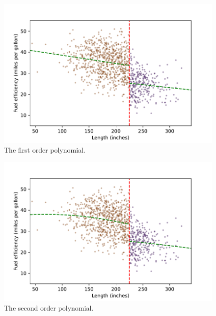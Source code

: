 \documentclass{article}
\begin{document}
\begin{figure}[h!]
    \centering
    \includegraphics{homework 7/output/figure/scatterplot2.pdf}
    \caption{The first order polynomial.}
    \label{fig:scatterplot2}
\end{figure}


\begin{figure}[h!]
    \centering
    \includegraphics{homework 7/output/figure/scatterplot3.pdf}
    \caption{The second order polynomial.}
    \label{fig:scatterplot3}
\end{figure}
\end{document}
